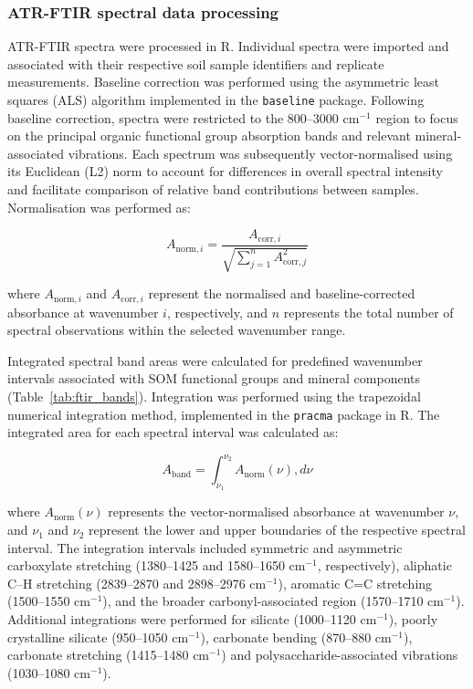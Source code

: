 \documentclass[preprint,12pt]{elsarticle}
\begin{document}
\subsubsection{ATR-FTIR spectral data processing}
ATR-FTIR spectra were processed in R. Individual spectra were imported and associated with their respective soil sample identifiers and replicate measurements. Baseline correction was performed using the asymmetric least squares (ALS) algorithm implemented in the \texttt{baseline} package. Following baseline correction, spectra were restricted to the 800--3000 cm$^{-1}$ region to focus on the principal organic functional group absorption bands and relevant mineral-associated vibrations. Each spectrum was subsequently vector-normalised using its Euclidean (L2) norm to account for differences in overall spectral intensity and facilitate comparison of relative band contributions between samples. Normalisation was performed as:

\begin{equation}
A_{\mathrm{norm},i} =
\frac{A_{\mathrm{corr},i}}
{\sqrt{\displaystyle\sum_{j=1}^{n} A_{\mathrm{corr},j}^{2}}}
\label{eq:ftir_vector_normalisation}
\end{equation}

where $A_{\mathrm{norm},i}$ and $A_{\mathrm{corr},i}$ represent the normalised and baseline-corrected absorbance at wavenumber $i$, respectively, and $n$ represents the total number of spectral observations within the selected wavenumber range.

Integrated spectral band areas were calculated for predefined wavenumber intervals associated with SOM functional groups and mineral components (Table~\ref{tab:ftir_bands}). Integration was performed using the trapezoidal numerical integration method, implemented in the \texttt{pracma} package in R. The integrated area for each spectral interval was calculated as:

\begin{equation}
A_{\mathrm{band}} =
\int_{\nu_1}^{\nu_2}
A_{\mathrm{norm}}(\nu),d\nu
\label{eq:ftir_band_integration}
\end{equation}

where $A_{\mathrm{norm}}(\nu)$ represents the vector-normalised absorbance at wavenumber $\nu$, and $\nu_1$ and $\nu_2$ represent the lower and upper boundaries of the respective spectral interval. The integration intervals included symmetric and asymmetric carboxylate stretching (1380--1425 and 1580--1650 cm$^{-1}$, respectively), aliphatic C--H stretching (2839--2870 and 2898--2976 cm$^{-1}$), aromatic C=C stretching (1500--1550 cm$^{-1}$), and the broader carbonyl-associated region (1570--1710 cm$^{-1}$). Additional integrations were performed for silicate (1000--1120 cm$^{-1}$), poorly crystalline silicate (950--1050 cm$^{-1}$), carbonate bending (870--880 cm$^{-1}$), carbonate stretching (1415--1480 cm$^{-1}$) and polysaccharide-associated vibrations (1030--1080 cm$^{-1}$).
\end{document}
